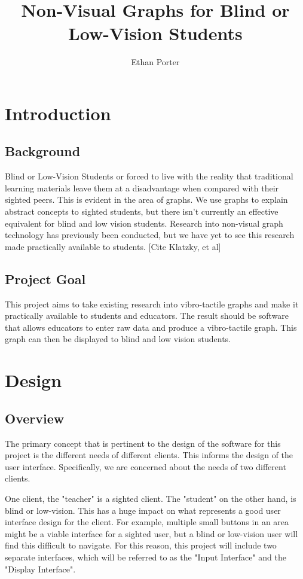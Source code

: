 \documentclass[]{article}
\title{Non-Visual Graphs for Blind or Low-Vision Students}
\author{Ethan Porter}
\begin{document}
\maketitle

\section{Introduction}
\subsection{Background}
Blind or Low-Vision Students or forced to live with the reality that traditional learning materials leave them at a disadvantage when compared with their sighted peers.  This is evident in the area of graphs.  We use graphs to explain abstract concepts to sighted students, but there isn't currently an effective equivalent for blind and low vision students.  Research into non-visual graph technology has previously been conducted, but we have yet to see this research made practically available to students. [Cite Klatzky, et al]
\subsection{Project Goal}
This project aims to take existing research into vibro-tactile graphs and make it practically available to students and educators.  The result should be software that allows educators to enter raw data and produce a vibro-tactile graph.  This graph can then be displayed to blind and low vision students.

\section{Design}
\subsection{Overview}
The primary concept that is pertinent to the design of the software for this project is the different needs of different clients.  This informs the design of the user interface.  Specifically, we are concerned about the needs of two different clients.

One client, the "teacher" is a sighted client.  The "student" on the other hand, is blind or low-vision.  This has a huge impact on what represents a good user interface design for the client.  For example, multiple small buttons in an area might be a viable interface for a sighted user, but a blind or low-vision user will find this difficult to navigate.  For this reason, this project will include two separate interfaces, which will be referred to as the "Input Interface" and the "Display Interface".
\end{document}
